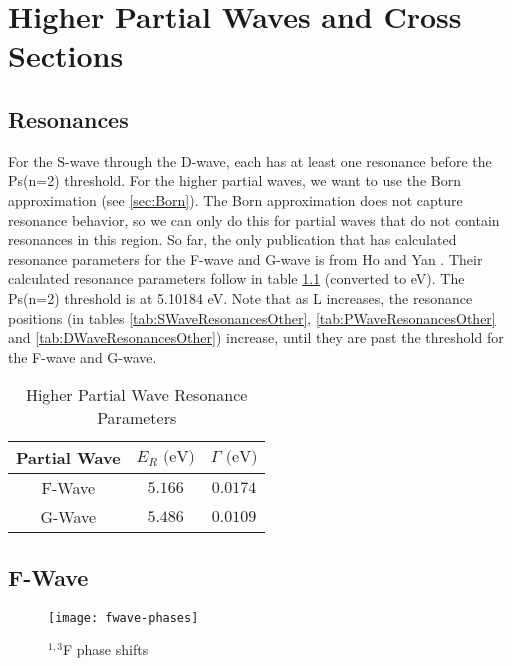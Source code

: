 \documentclass[Dissertation.tex]{subfiles}
\begin{document}
\clearpage
\pagebreak
\newpage

\chapter{Higher Partial Waves and Cross Sections}
\label{chp:HigherWaves}


\section{Resonances}
For the S-wave through the D-wave, each has at least one resonance before the Ps(n=2) threshold. For the higher partial waves, we want to use the Born approximation (see \ref{sec:Born}). The Born approximation does not capture resonance behavior, so we can only do this for partial waves that do not contain resonances in this region. So far, the only publication that has calculated resonance parameters for the F-wave and G-wave is from Ho and Yan \cite{Ho2000}. Their calculated resonance parameters follow in table \ref{tab:HigherResonancesOther} (converted to eV). The Ps(n=2) threshold is at 5.10184 eV. Note that as L increases, the resonance positions (in tables \ref{tab:SWaveResonancesOther}, \ref{tab:PWaveResonancesOther} and \ref{tab:DWaveResonancesOther}) increase, until they are past the threshold for the F-wave and G-wave. 

\setlength{\abovecaptionskip}{6pt}
\setlength{\belowcaptionskip}{6pt}
\begin{table}[H]
\centering
\begin{tabular}{c c c}
\toprule
Partial Wave & $E_R \text{ (eV)}$ & $\Gamma \text{ (eV)}$ \\
\midrule
F-Wave & $5.166$ & $0.0174$ \\
G-Wave & $5.486$ & $0.0109$ \\
\bottomrule
\end{tabular}
\caption{Higher Partial Wave Resonance Parameters}
\label{tab:HigherResonancesOther}
\end{table}


\section{F-Wave}
\label{sec:FWave}

\begin{figure}[H]
	\centering
	\texttt{[image: fwave-phases]}
	\caption{$^{1,3}$F phase shifts}
	\label{fig:FWavePhase}
\end{figure}
\end{document}
